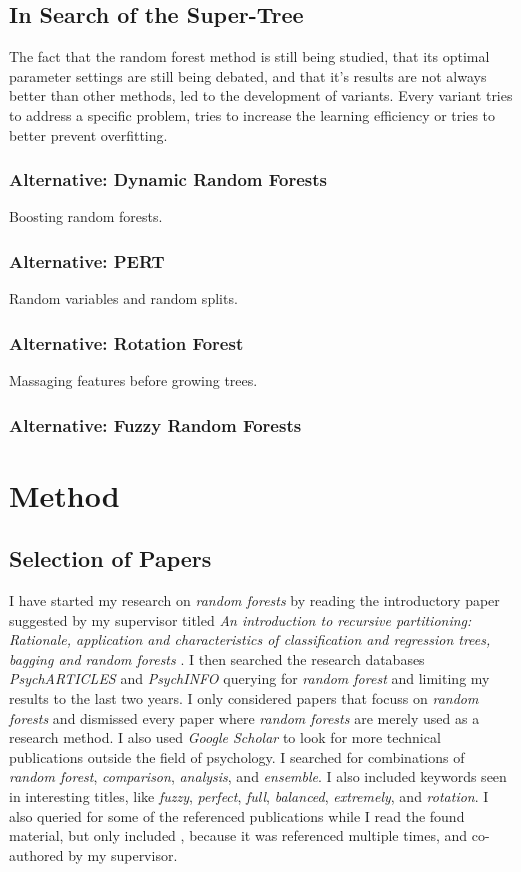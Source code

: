 \documentclass[a4paper,man,12pt,apacite]{apa6} %
\begin{document}
\subsection{In Search of the Super-Tree}
The fact that the random forest method is still being studied, that its
optimal parameter settings are still being debated, and that it's results
are not always better than other methods, led to the development of
variants.
Every variant tries to address a specific problem, tries to increase the
learning efficiency or tries to better prevent overfitting.

\subsubsection{Alternative: Dynamic Random Forests}
Boosting random forests.

\subsubsection{Alternative: PERT}
Random variables and random splits.

\subsubsection{Alternative: Rotation Forest}
Massaging features before growing trees.

\subsubsection{Alternative: Fuzzy Random Forests}

\section{Method}

\subsection{Selection of Papers}
I have started my research on \emph{random forests} by reading the
introductory paper suggested by my supervisor titled
\emph{An introduction to recursive partitioning: Rationale, application
and characteristics of classification and regression trees, bagging and
random forests} \cite{strobl2009introduction}.
I then searched the research databases \emph{PsychARTICLES} and
\emph{PsychINFO} querying for \emph{random forest} and limiting my results
to the last two years.
I only considered papers that focuss on \emph{random forests} and
dismissed every paper where \emph{random forests} are merely used as a
research method.
I also used \emph{Google Scholar} to look for more technical
publications outside the field of psychology.
I searched for combinations of \emph{random forest}, \emph{comparison},
\emph{analysis}, and \emph{ensemble}.
I also included keywords seen in interesting titles, like \emph{fuzzy},
\emph{perfect}, \emph{full}, \emph{balanced}, \emph{extremely}, and
\emph{rotation}.
I also queried for some of the referenced publications while I read the
found material, but only included \cite{strobl2008conditional}, because
it was referenced multiple times, and co-authored by my supervisor.
\end{document}
